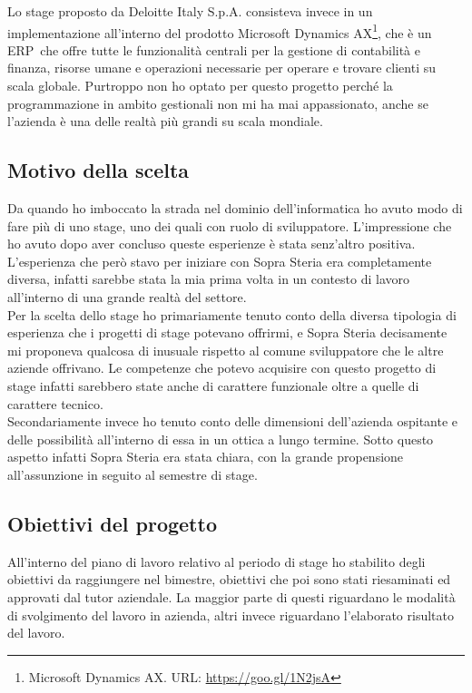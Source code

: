Lo stage proposto da Deloitte Italy S.p.A. consisteva invece in un implementazione all'interno del prodotto Microsoft Dynamics AX\footnote{Microsoft Dynamics AX. URL: \url{https://goo.gl/1N2jsA}}, che è un ERP\glossario\ che offre tutte le funzionalità centrali per la gestione di contabilità e finanza, risorse umane e operazioni necessarie per operare e trovare clienti su scala globale. Purtroppo non ho optato per questo progetto perché la programmazione in ambito gestionali non mi ha mai appassionato, anche se l'azienda è una delle realtà più grandi su scala mondiale.\\

\subsection{Motivo della scelta}

Da quando ho imboccato la strada nel dominio dell'informatica ho avuto modo di fare più di uno stage, uno dei quali con ruolo di sviluppatore. L'impressione che ho avuto dopo aver concluso queste esperienze è stata senz'altro positiva. L'esperienza che però stavo per iniziare con Sopra Steria era completamente diversa, infatti sarebbe stata la mia prima volta in un contesto di lavoro all'interno di una grande realtà del settore.\\

Per la scelta dello stage ho primariamente tenuto conto della diversa tipologia di esperienza che i progetti di stage potevano offrirmi, e Sopra Steria decisamente mi proponeva qualcosa di inusuale rispetto al comune sviluppatore che le altre aziende offrivano. Le competenze che potevo acquisire con questo progetto di stage infatti sarebbero state anche di carattere funzionale oltre a quelle di carattere tecnico.\\

Secondariamente invece ho tenuto conto delle dimensioni dell'azienda ospitante e delle possibilità all'interno di essa in un ottica a lungo termine. Sotto questo aspetto infatti Sopra Steria era stata chiara, con la grande propensione all'assunzione in seguito al semestre di stage.

\subsection{Obiettivi del progetto}
All'interno del piano di lavoro relativo al periodo di stage ho stabilito degli obiettivi da raggiungere nel bimestre, obiettivi che poi sono stati riesaminati ed approvati dal tutor aziendale. La maggior parte di questi riguardano le modalità di svolgimento del lavoro in azienda, altri invece riguardano l'elaborato risultato del lavoro.\\

